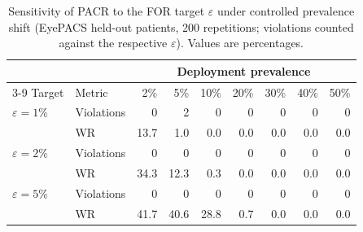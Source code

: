 \begin{table}[!htbp]
\centering
\caption{Sensitivity of PACR to the FOR target $\varepsilon$ under controlled prevalence shift (EyePACS held-out patients, 200 repetitions; violations counted against the respective $\varepsilon$). Values are percentages.}
\label{tab:eps}
\footnotesize
\begin{tabular}{@{}llrrrrrrr@{}}
\toprule
 & & \multicolumn{7}{c}{Deployment prevalence} \\
\cmidrule(l){3-9}
Target & Metric & 2\% & 5\% & 10\% & 20\% & 30\% & 40\% & 50\% \\
\midrule
$\varepsilon=1\%$ & Violations & 0 & 2 & 0 & 0 & 0 & 0 & 0 \\
 & WR & 13.7 & 1.0 & 0.0 & 0.0 & 0.0 & 0.0 & 0.0 \\
\addlinespace
$\varepsilon=2\%$ & Violations & 0 & 0 & 0 & 0 & 0 & 0 & 0 \\
 & WR & 34.3 & 12.3 & 0.3 & 0.0 & 0.0 & 0.0 & 0.0 \\
\addlinespace
$\varepsilon=5\%$ & Violations & 0 & 0 & 0 & 0 & 0 & 0 & 0 \\
 & WR & 41.7 & 40.6 & 28.8 & 0.7 & 0.0 & 0.0 & 0.0 \\
\bottomrule
\end{tabular}
\end{table}
